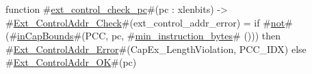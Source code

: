 function #\hyperref[sailRISCVzextzycontrolzycheckzypc]{ext\_control\_check\_pc}#(pc : xlenbits) -> #\hyperref[sailRISCVzExtzyControlAddrzyCheck]{Ext\_ControlAddr\_Check}#(ext_control_addr_error) = {
  if   #\hyperref[sailRISCVznot]{not}#(#\hyperref[sailRISCVzinCapBounds]{inCapBounds}#(PCC, pc, #\hyperref[sailRISCVzminzyinstructionzybytes]{min\_instruction\_bytes}# ()))
  then #\hyperref[sailRISCVzExtzyControlAddrzyError]{Ext\_ControlAddr\_Error}#(CapEx_LengthViolation, PCC_IDX)
  else #\hyperref[sailRISCVzExtzyControlAddrzyOK]{Ext\_ControlAddr\_OK}#(pc)
}
